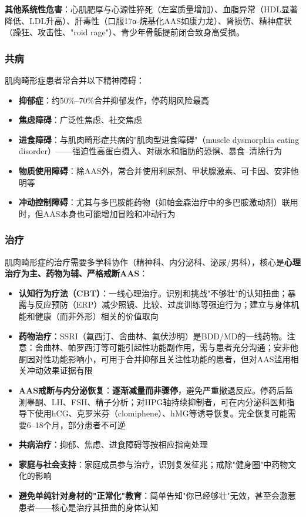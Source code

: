 \textbf{其他系统性危害}：心肌肥厚与心源性猝死（左室质量增加）、血脂异常（HDL显著降低、LDL升高）、肝毒性（口服17α-烷基化AAS如康力龙）、肾损伤、精神症状（躁狂、攻击性、"roid rage"）、青少年骨骺提前闭合致身高受损。

\subsubsection{共病}

肌肉畸形症患者常合并以下精神障碍：

\begin{itemize}[leftmargin=2cm]
	\item \textbf{抑郁症}：约50\%--70\%合并抑郁发作，停药期风险最高
	\item \textbf{焦虑障碍}：广泛性焦虑、社交焦虑
	\item \textbf{进食障碍}：与肌肉畸形症共病的"肌肉型进食障碍"（muscle dysmorphia eating disorder）——强迫性高蛋白摄入、对碳水和脂肪的恐惧、暴食--清除行为
	\item \textbf{物质使用障碍}：除AAS外，常合并使用利尿剂、甲状腺激素、可卡因、安非他明等
	\item \textbf{冲动控制障碍}：尤其与多巴胺能药物（如帕金森治疗中的多巴胺激动剂）联用时，但AAS本身也可能增加冒险和冲动行为
\end{itemize}

\subsubsection{治疗}

肌肉畸形症的治疗需要多学科协作（精神科、内分泌科、泌尿/男科），核心是\textbf{心理治疗为主、药物为辅、严格戒断AAS}：

\begin{itemize}[leftmargin=2cm]
	\item \textbf{认知行为疗法（CBT）}：一线心理治疗。识别和挑战"不够壮"的认知扭曲；暴露与反应预防（ERP）减少照镜、比较、过度训练等强迫行为；建立与身体机能和健康（而非外形）相关的价值取向
	\item \textbf{药物治疗}：SSRI（氟西汀、舍曲林、氟伏沙明）是BDD/MD的一线药物。注意：舍曲林、帕罗西汀等可能引起性功能副作用，需与患者充分沟通；安非他酮因对性功能影响小，可用于合并抑郁且关注性功能的患者，但对AAS滥用相关冲动效果证据有限
	\item \textbf{AAS戒断与内分泌恢复}：\textbf{逐渐减量而非骤停}，避免严重撤退反应。停药后监测睾酮、LH、FSH、精子分析；对HPG轴持续抑制者，可在内分泌科医师指导下使用hCG、克罗米芬（clomiphene）、hMG等诱导恢复。完全恢复可能需要6--18个月，部分患者不可逆
	\item \textbf{共病治疗}：抑郁、焦虑、进食障碍等按相应指南处理
	\item \textbf{家庭与社会支持}：家庭成员参与治疗，识别复发征兆；戒除"健身圈"中药物文化的影响
	\item \textbf{避免单纯针对身材的"正常化"教育}：简单告知"你已经够壮"无效，甚至会激惹患者——核心是治疗其扭曲的身体认知
\end{itemize}

